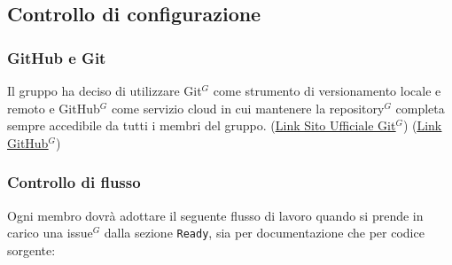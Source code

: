 \documentclass[a4paper,10pt]{article}
\begin{document}
\subsection{Controllo di configurazione}

\subsubsection{GitHub e Git}
Il gruppo ha deciso di utilizzare Git$^G$ come strumento di versionamento locale e remoto e GitHub$^G$ come servizio cloud in cui mantenere la repository$^G$
completa sempre accedibile da tutti i membri del gruppo.
(\href{https://git-scm.com/}{\underline{Link Sito Ufficiale Git$^G$}})
(\href{https://github.com/}{\underline{Link GitHub$^G$}})

\subsubsection{Controllo di flusso}
Ogni membro dovrà adottare il seguente flusso di lavoro quando si prende in carico una issue$^G$ dalla sezione \texttt{Ready},
sia per documentazione che per codice sorgente:
\end{document}
